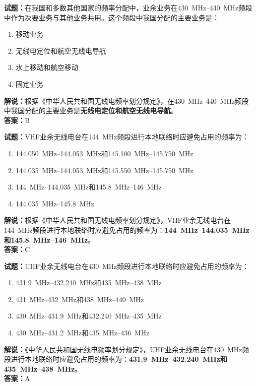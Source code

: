 \documentclass{ctexbook}
\begin{document}
\noindent\textbf{试题：}在我国和多数其他国家的频率分配中，业余业务在\qtyrange[range-phrase=--]{430}{440}{\MHz}频段中作为次要业务与其他业务共用。这个频段中我国分配的主要业务是：
\begin{enumerate}[leftmargin=3em]
  \item 移动业务
  \item 无线电定位和航空无线电导航
  \item 水上移动和航空移动
  \item 固定业务
\end{enumerate}
\noindent\textbf{解说：}根据《中华人民共和国无线电频率划分规定》，在\qtyrange[range-phrase=--]{430}{440}{\MHz}频段中我国分配的主要业务是\textbf{无线电定位和航空无线电导航}。\\\noindent\textbf{答案：}B

\vspace{\baselineskip}

\noindent\textbf{试题：}VHF业余无线电台在\qty{144}{\MHz}频段进行本地联络时应避免占用的频率为：
\begin{enumerate}[leftmargin=3em]
  \item \qtyrange[range-phrase=--]{144.050}{144.053}{\MHz}和\qtyrange[range-phrase=--]{145.100}{145.750}{\MHz}
  \item \qtyrange[range-phrase=--]{144.035}{144.053}{\MHz}和\qtyrange[range-phrase=--]{145.550}{145.750}{\MHz}
  \item \qtyrange[range-phrase=--]{144}{144.035}{\MHz}和\qtyrange[range-phrase=--]{145.8}{146}{\MHz}
  \item \qtyrange[range-phrase=--]{144.035}{145.8}{\MHz}
\end{enumerate}
\noindent\textbf{解说：}根据《中华人民共和国无线电频率划分规定》，VHF业余无线电台在\qty{144}{\MHz}频段进行本地联络时应避免占用的频率为：\textbf{\qtyrange[range-phrase=--]{144}{144.035}{\MHz}和\qtyrange[range-phrase=--]{145.8}{146}{\MHz}}。\\\noindent\textbf{答案：}C

\vspace{\baselineskip}

\noindent\textbf{试题：}UHF业余无线电台在\qty{430}{\MHz}频段进行本地联络时应避免占用的频率为：
\begin{enumerate}[leftmargin=3em]
  \item \qtyrange[range-phrase=--]{431.9}{432.240}{\MHz}和\qtyrange[range-phrase=--]{435}{438}{\MHz}
  \item \qtyrange[range-phrase=--]{431}{432}{\MHz}和\qtyrange[range-phrase=--]{438}{440}{\MHz}
  \item \qtyrange[range-phrase=--]{430}{431.9}{\MHz}和\qtyrange[range-phrase=--]{432.240}{435}{\MHz}
  \item \qtyrange[range-phrase=--]{430}{431.2}{\MHz}和\qtyrange[range-phrase=--]{435}{436}{\MHz}
\end{enumerate}
\noindent\textbf{解说：}《中华人民共和国无线电频率划分规定》，UHF业余无线电台在\qty{430}{\MHz}频段进行本地联络时应避免占用的频率为：\textbf{\qtyrange[range-phrase=--]{431.9}{432.240}{\MHz}和\qtyrange[range-phrase=--]{435}{438}{\MHz}}。\\\noindent\textbf{答案：}A
\end{document}
